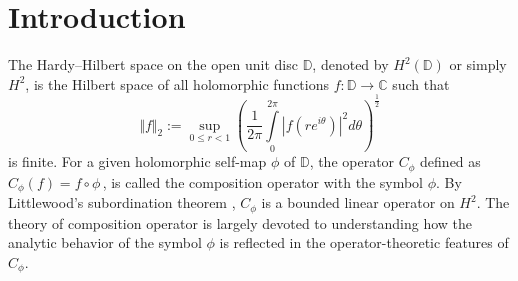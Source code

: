 \documentclass[12pt, reqno]{amsart}
\theoremstyle{definition}
\numberwithin{equation}{section}
\begin{document}

\section{Introduction}
The Hardy–Hilbert space on the open unit disc $\mathbb{D}$, denoted by $H^2({\mathbb{D}})$ or simply $H^2$, is the Hilbert space of  all holomorphic functions $f:\mathbb{D}\rightarrow \mathbb{C}$
such that 
$$
\Vert f\Vert_{2}:=\sup\limits_{0\leq r<1}\left(\dfrac{1}{2\pi}\int\limits_{0}^{2\pi}
|f(re^{i\theta})|^2d\theta\right)^{\frac{1}{2}}
$$ 
is finite.
 For a given holomorphic self-map $\phi$ of $\mathbb{D}$, the operator $C_\phi$
defined as $C_\phi(f)=f \circ \phi\,$,  is called the composition operator with the symbol $\phi$. By Littlewood’s subordination theorem \cite[Page~11]{shapiro1}, $C_\phi$
is a bounded linear operator on $H^2$. The theory of composition operator is largely devoted to understanding how the analytic behavior of the symbol $\phi$ is reflected in the operator-theoretic features of $C_\phi$.

\end{document}
